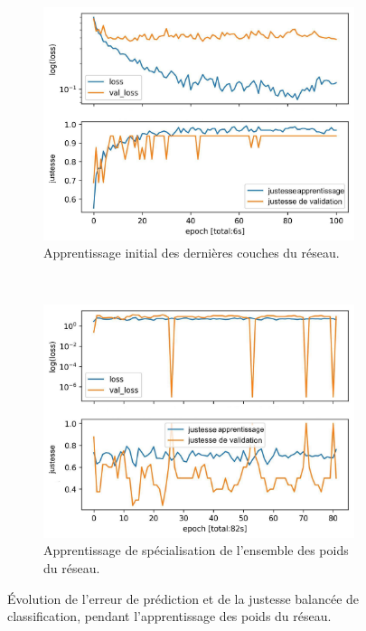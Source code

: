 \begin{figure}[hbtp]
	\centering
	\begin{subfigure}[c]{0.75\textwidth}
		\includegraphics[width=\textwidth]{../Chap5/Figures/8_photo_Qtotal_crop_DNN_top_model_training.jpg}
		\caption{Apprentissage initial des dernières couches du réseau.}
		\vspace*{5mm}
	\end{subfigure}
	\\
	\begin{subfigure}[c]{0.75\textwidth}
		\includegraphics[width=\textwidth]{../Chap5/Figures/9_photo_Qtotal_crop_DNN_full_model_fine-tuning.jpg}
		\caption{Apprentissage de spécialisation de l'ensemble des poids du réseau.}
	\end{subfigure}
	\caption{Évolution de l'erreur de prédiction et de la justesse balancée de classification, pendant l'apprentissage des poids du réseau.}
	\label{fig:learning}
\end{figure}

